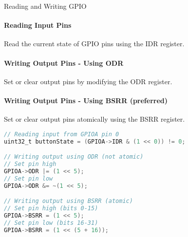 \begin{KR}{Reading and Writing GPIO}
\paragraph{Reading Input Pins}
Read the current state of GPIO pins using the IDR register.
\paragraph{Writing Output Pins - Using ODR}
Set or clear output pins by modifying the ODR register.
\paragraph{Writing Output Pins - Using BSRR (preferred)}
Set or clear output pins atomically using the BSRR register.

\begin{lstlisting}[language=C, style=basesmol] 
// Reading input from GPIOA pin 0
uint32_t buttonState = (GPIOA->IDR & (1 << 0)) != 0;

// Writing output using ODR (not atomic)
// Set pin high
GPIOA->ODR |= (1 << 5);
// Set pin low
GPIOA->ODR &= ~(1 << 5);

// Writing output using BSRR (atomic)
// Set pin high (bits 0-15)
GPIOA->BSRR = (1 << 5);
// Set pin low (bits 16-31)
GPIOA->BSRR = (1 << (5 + 16));
\end{lstlisting}
\end{KR}

